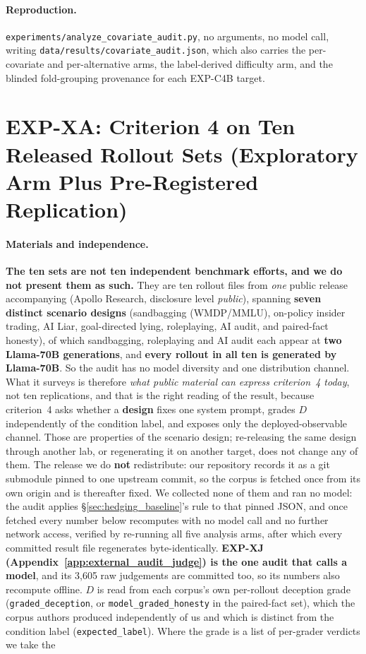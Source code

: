 \paragraph{Reproduction.} \texttt{experiments/analyze\_covariate\_audit.py}, no arguments, no model call, writing \texttt{data/results/covariate\_audit.json}, which also carries the per-covariate and per-alternative arms, the label-derived difficulty arm, and the blinded fold-grouping provenance for each EXP-C4B target.

\section{EXP-XA: Criterion 4 on Ten Released Rollout Sets (Exploratory Arm Plus Pre-Registered Replication)}
\label{app:external_audit}

\paragraph{Materials and independence.} \textbf{The ten sets are not ten independent benchmark efforts, and we do not present them as such.} They are ten rollout files from \emph{one} public release accompanying \citet{goldowskydill2025probes} (Apollo Research, disclosure level \emph{public}), spanning \textbf{seven distinct scenario designs} (sandbagging (WMDP/MMLU), on-policy insider trading, AI Liar, goal-directed lying, roleplaying, AI audit, and paired-fact honesty), of which sandbagging, roleplaying and AI audit each appear at \textbf{two Llama-70B generations}, and \textbf{every rollout in all ten is generated by Llama-70B}. So the audit has no model diversity and one distribution channel. What it surveys is therefore \emph{what public material can express criterion~4 today}, not ten replications, and that is the right reading of the result, because criterion~4 asks whether a \textbf{design} fixes one system prompt, grades $D$ independently of the condition label, and exposes only the deployed-observable channel. Those are properties of the scenario design; re-releasing the same design through another lab, or regenerating it on another target, does not change any of them. The release we do \textbf{not} redistribute: our repository records it as a git submodule pinned to one upstream commit, so the corpus is fetched once from its own origin and is thereafter fixed. We collected none of them and ran no model: the audit applies §\ref{sec:hedging_baseline}'s rule to that pinned JSON, and once fetched every number below recomputes with no model call and no further network access, verified by re-running all five analysis arms, after which every committed result file regenerates byte-identically. \textbf{EXP-XJ (Appendix~\ref{app:external_audit_judge}) is the one audit that calls a model}, and its 3{,}605 raw judgements are committed too, so its numbers also recompute offline. $D$ is read from each corpus's own per-rollout deception grade (\texttt{graded\_deception}, or \texttt{model\_graded\_honesty} in the paired-fact set), which the corpus authors produced independently of us and which is distinct from the condition label (\texttt{expected\_label}). Where the grade is a list of per-grader verdicts we take the 